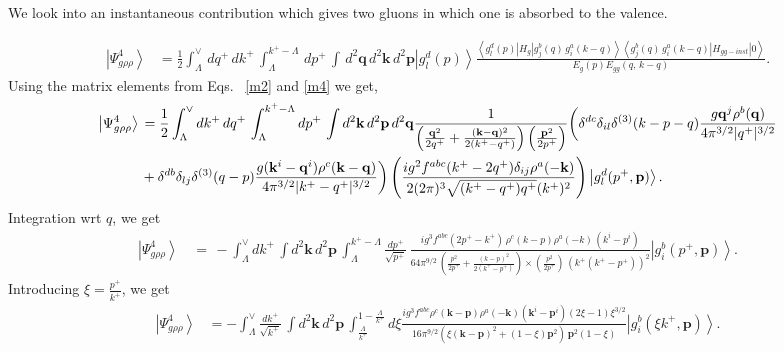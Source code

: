 \documentclass[aps,prd,amsmath,amssymb,nofootinbib]{revtex4-2}
\numberwithin{equation}{section}
\begin{document}
\pagebreak 
We look into an instantaneous contribution which gives two gluons in which one is absorbed to the valence.  
\begin{figure}[h]
    \label{fig:7}
\end{figure}
\begin{align} \label{gfour}
\left|\Psi_{g\rho\rho}^{4}\right\rangle & =\frac{1}{2}\int_{\Lambda}^{\vee}\, dq^{+}\, dk^{+}\,\int_{\Lambda}^{k^{+}-\Lambda}\, dp^{+}\,\int\, d^{2}\mathbf{q}\, d^{2}\mathbf{k}\, d^{2}\mathbf{p}\left|g_{l}^{d}(p)\right\rangle \frac{\left\langle g_{l}^{d}(p)\left|H_{g}\right|g_{j}^{b}(q)\, g_{i}^{a}(k-q)\right\rangle \left\langle g_{j}^{b}(q)\, g_{i}^{a}(k-q)\left|H_{gg-inst}\right|0\right\rangle }{E_{g}(p)E_{gg}(q,\, k-q)}.
\end{align}
Using the matrix elements from Eqs.~ \eqref{m2} and \eqref{m4} we get,
 \begin{align}\label{inst4}
\left|\Psi_{g\rho\rho}^{4}\right\rangle \,& = \frac{1}{2}\int_{\Lambda}^{\vee}dk^{+}\,dq^{+}\,\int_{\Lambda}^{k^{+}-\Lambda}dp^{+}\, \int d^{2}\mathbf{k}\, d^{2}\mathbf{p}\, d^{2}\mathbf{q}\frac{1}{\left(\frac{\mathbf{q}^{2}}{2q^{+}}+\frac{(\mathbf{k}-\mathbf{q})^{2}}{2(k^{+}-q^{+})}\right)\left(\frac{\mathbf{p}^{2}}{2p^{+}}\right)}\bigg(\delta^{dc}\delta_{il}\delta^{(3)}(k-p-q)\frac{g\mathbf{q}^{j}\rho^{b}(\mathbf{q})}{4\pi^{3/2}|q^{+}|^{3/2}}\notag \\ & +\delta^{db}\delta_{lj}\delta^{(3)}(q-p)\frac{g(\mathbf{k}^{i}-\mathbf{q}^{i})\rho^{c}(\mathbf{k}-\mathbf{q})}{4\pi^{3/2}|k^{+}-q^{+}|^{3/2}}\bigg) \left(\frac{ig^{2}f^{abc}(k^{+}-2q^{+})\delta_{ij}\rho^{a}(-\mathbf{k})}{2(2\pi)^{3}\sqrt{(k^{+}-q^{+})q^{+}}(k^{+})^{2}}\right)\left|g_{l}^{d}(p^{+},\mathbf{p})\right\rangle .
\end{align}
Integration wrt $q$, we get
\begin{align}
    \left|\Psi_{g\rho\rho}^{4}\right\rangle \,& = \,- \int_{\Lambda}^{\vee}dk^{+}\,\int d^{2}\mathbf{k}\, d^{2}\mathbf{p}\,\int_{\Lambda}^{k^{+}-\Lambda}\frac{dp^{+}}{\sqrt{p^{+}}}\,\frac{ig^{3}f^{abc}(2p^{+}-k^{+})\,\rho^{c}(k-p)\rho^{a}(-k)\,(k^{i}-p^{i})}{64\pi^{9/2}\,\left(\frac{p^{2}}{2p^{+}}+\frac{(k-p)^{2}}{2(k^{+}-p^{+})}\right)\times \left(\frac{p^{2}}{2p^{+}}\right)\, \left(k^{+}(k^{+}-p^{+})\right)^{2}}\left|g_{i}^{b}(p^{+},\mathbf{p})\right\rangle.    
\end{align}
Introducing $\xi = \frac{p^+}{k^+}$, we get
    \begin{align}\label{psif}
\left|\Psi_{g\rho\rho}^{4}\right\rangle & = -\int_{\Lambda}^{\vee}\frac{dk^{+}}{\sqrt{k^{+}}}\,\int d^{2}\mathbf{k}\, d^{2}\mathbf{p}\,\int_{\frac{\Lambda}{k^{+}}}^{1-\frac{\Lambda}{k^{+}}}d\xi \frac{ig^{3}f^{abc}\rho^{c}(\mathbf{k}-\mathbf{p})\rho^{a}(-\mathbf{k})(\mathbf{k}^{i}-\mathbf{p}^{i})(2\xi-1)\xi^{3/2}}{16\pi^{9/2}\left(\xi(\mathbf{k}-\mathbf{p})^{2}+(1-\xi)\mathbf{p}^{2}\right)\,\mathbf{p}^{2}(1-\xi)}\left|g_{i}^{b}(\xi k^{+},\mathbf{p})\right\rangle .
\end{align}
\end{document}
